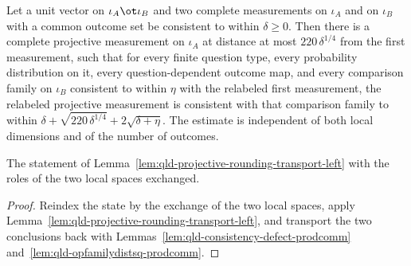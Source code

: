 	\begin{lemma}
		\label{lem:qld-projective-rounding-transport-left}
		\leanok
		Let a unit vector on $\iota_A \ot \iota_B$ and two complete measurements on
		$\iota_A$ and on $\iota_B$ with a common outcome set be consistent to
		within $\delta \geq 0$. Then there is a complete projective measurement on
		$\iota_A$ at distance at most $220\,\delta^{1/4}$ from the first
		measurement, such that for every finite question type, every probability
		distribution on it, every question-dependent outcome map, and every
		comparison family on $\iota_B$ consistent to within $\eta$ with the
		relabeled first measurement, the relabeled projective measurement is
		consistent with that comparison family to within
		$\delta + \sqrt{220\,\delta^{1/4}} + 2\sqrt{\delta + \eta}$. The estimate
		is independent of both local dimensions and of the number of outcomes.
	\end{lemma}

	\begin{lemma}
		\label{lem:qld-projective-rounding-transport-right}
		\leanok
		The statement of
		Lemma~\ref{lem:qld-projective-rounding-transport-left} with the roles of
		the two local spaces exchanged.
	\end{lemma}
	\begin{proof}
		\leanok
		Reindex the state by the exchange of the two local spaces, apply
		Lemma~\ref{lem:qld-projective-rounding-transport-left}, and transport the
		two conclusions back with
		Lemmas~\ref{lem:qld-consistency-defect-prodcomm}
		and~\ref{lem:qld-opfamilydistsq-prodcomm}.
	\end{proof}

